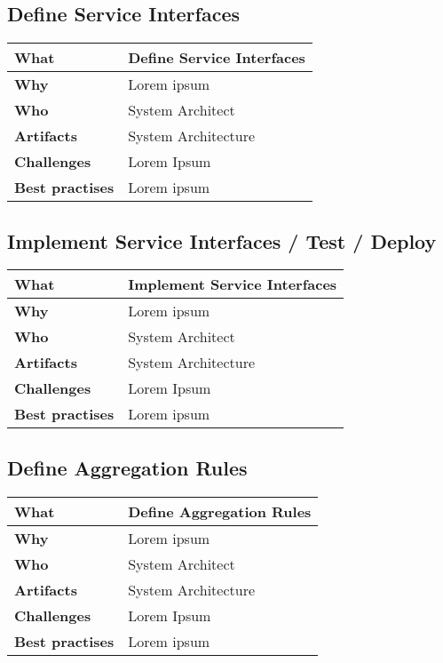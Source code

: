 \subsection{Define Service Interfaces}
 \label{table:ch6_Task_Define_Service_Interfaces}
\begin{tabular}
	{|m{3cm}|m{10cm}|} \hline \bfseries What & Define Service Interfaces\\
	\hline \bfseries Why & Lorem ipsum\\
	\hline \bfseries Who & System Architect\\
	\hline \bfseries Artifacts & System Architecture\\
	\hline \bfseries Challenges & Lorem Ipsum\\
	\hline \bfseries Best practises & Lorem ipsum\\
	\hline 
\end{tabular}

\subsection{Implement Service Interfaces / Test / Deploy}
 \label{table:ch6_Task_Implement_Service_Interfaces}
\begin{tabular}
	{|m{3cm}|m{10cm}|} \hline \bfseries What & Implement Service Interfaces\\
	\hline \bfseries Why & Lorem ipsum\\
	\hline \bfseries Who & System Architect\\
	\hline \bfseries Artifacts & System Architecture\\
	\hline \bfseries Challenges & Lorem Ipsum\\
	\hline \bfseries Best practises & Lorem ipsum\\
	\hline 
\end{tabular}

\subsection{Define Aggregation Rules}
 \label{table:ch6_Task_Define_Aggregation_Rules}
\begin{tabular}
	{|m{3cm}|m{10cm}|} \hline \bfseries What & Define Aggregation Rules\\
	\hline \bfseries Why & Lorem ipsum\\
	\hline \bfseries Who & System Architect\\
	\hline \bfseries Artifacts & System Architecture\\
	\hline \bfseries Challenges & Lorem Ipsum\\
	\hline \bfseries Best practises & Lorem ipsum\\
	\hline 
\end{tabular}

